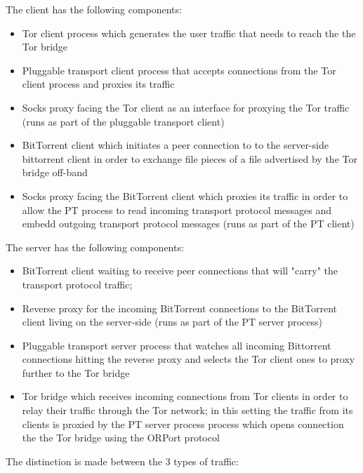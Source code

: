 \documentclass[11pt]{book} %
\begin{document}
The client has the following components:

\begin{itemize}
\item Tor client process which generates the user traffic that needs to reach the the Tor bridge
\item Pluggable transport client process that accepts connections from the Tor client process and proxies its traffic
\item Socks proxy facing the Tor client as an interface for proxying the Tor traffic (runs as part of the pluggable transport client) 
\item BitTorrent client which initiates a peer connection to to the server-side bittorrent client in order to exchange file pieces of a file advertised by the Tor bridge off-band
\item Socks proxy facing the BitTorrent client which proxies its traffic in order to allow the PT process to read   incoming transport protocol messages and embedd outgoing transport protocol messages (runs as part of the PT client) 
\end{itemize}

The server has the following components:

\begin{itemize}

\item BitTorrent client waiting to receive peer connections that will "carry" the transport protocol traffic; 
\item Reverse proxy for the incoming BitTorrent connections to the BitTorrent client living on the server-side (runs as part of the PT server process)
\item Pluggable transport server process that watches all incoming Bittorrent connections hitting the reverse proxy and selects the Tor client ones to proxy further to the Tor bridge
\item Tor bridge which receives incoming connections from Tor clients in order to relay their traffic through the Tor network; in this setting the traffic from its clients is proxied by the PT server process process which opens connection the the Tor bridge using the ORPort protocol

\end{itemize}


The distinction is made between the 3 types of traffic:
\end{document}
